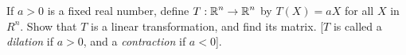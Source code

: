 \documentclass[../main.tex]{subfiles}
\begin{document}
If $a > 0$ is a fixed real number, define $T: \operatorname{\mathbb{R}}^n \to \operatorname{\mathbb{R}}^n$ by $T(X) = aX$ for all $X$ in $R^n$. Show that $T$ is a linear transformation, and find its matrix. [$T$ is called a \emph{dilation} if $a > 0$, and a \emph{contraction} if $a < 0$].

\solution
\end{document}

